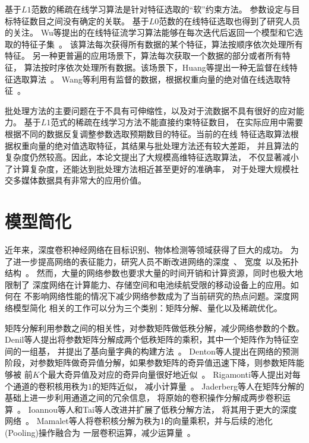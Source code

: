 \documentclass[doctor]{ustcthesis}
\begin{document}
基于$L1$范数的稀疏在线学习算法是针对特征选取的``软''约束方法。
参数设定与目标特征数目之间没有确定的关联。
基于$L0$范数的在线特征选取也得到了研究人员的关注。
Wu等提出的在线特征流学习算法能够在每次迭代后返回一个模型和它选取的特征子集~\cite{wu2010online}。
该算法每次获得所有数据的某个特征，算法按顺序依次处理所有特征。
另一种更普遍的应用场景下，算法每次获取一个数据的部分或者所有特征，
算法按时序依次处理所有数据。该场景下，Huang等提出一种无监督在线特征选取算法~\cite{huang2015unsupervised}。
Wang等利用有监督的数据，根据权重向量的绝对值在线选取特征~\cite{wang2014online}。

批处理方法的主要问题在于不具有可伸缩性，以及对于流数据不具有很好的应对能力。
基于$L1$范式的稀疏在线学习方法不能直接约束特征数目，
在实际应用中需要根据不同的数据反复调整参数选取预期数目的特征。当前的在线
特征选取算法根据权重向量的绝对值选取特征，其结果与批处理方法还有较大差距，
并且算法的复杂度仍然较高。因此，本论文提出了大规模高维特征选取算法，
不仅显著减小了计算复杂度，还能达到批处理方法相近甚至更好的准确率，
对于处理大规模社交多媒体数据具有非常大的应用价值。

\section{模型简化}
近年来，深度卷积神经网络在目标识别、物体检测等领域获得了巨大的成功。
为了进一步提高网络的表征能力，研究人员不断改进网络的深度~\cite{simonyan2014very}、
宽度~\cite{zagoruyko2016wide}以及拓扑结构~\cite{szegedy2015going,srivastava2015highway,he2016deep}。
然而，大量的网络参数也要求大量的时间开销和计算资源，同时也极大地限制了
深度网络在计算能力、存储空间和电池续航受限的移动设备上的应用。如何在
不影响网络性能的情况下减少网络参数成为了当前研究的热点问题。深度网络模型简化
相关的工作可以分为三个类别：矩阵分解、量化以及稀疏优化。

矩阵分解利用参数之间的相关性，对参数矩阵做低秩分解，减少网络参数的个数。
Denil等人提出将参数矩阵分解成两个低秩矩阵的乘积，其中一个矩阵作为特征空间的一组基，
并提出了基向量字典的构建方法~\cite{denil2013predicting}。
Denton等人提出在网络的预测阶段，对参数矩阵做奇异值分解，如果参数矩阵的奇异值迅速下降，则参数矩阵能够被
前$K$个最大奇异值及对应的奇异向量很好地近似~\cite{denton2014exploiting}。
Rigamonti等人提出对每个通道的卷积核用秩为$1$的矩阵近似， 减小计算量~\cite{rigamonti2013learning}。
Jaderberg等人在矩阵分解的基础上进一步利用通道之间的冗余信息，
将原始的卷积操作分解成两步卷积运算~\cite{jaderberg2014speeding}。
Ioannou等人和Tai等人改进并扩展了低秩分解方法，
将其用于更大的深度网络~\cite{ioannou2015training,tai2015convolutional}。
Mamalet等人将卷积核分解为秩为1的向量乘积，并与后续的池化(Pooling)操作融合为
一层卷积运算，减少运算量~\cite{mamalet2012simplifying}。
\end{document}

